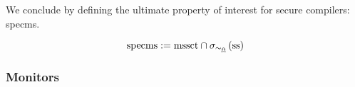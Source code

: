 \documentclass[a4paper,12pt]{article}
\begin{document}
We conclude by defining the ultimate property of interest for secure compilers: \gls*{specms}.
\begin{definition}{}
  \[
  \specmssafe := \msscctsafe\cap\sigma_{\sim_{\mathghost}}\left(\sssafe\right)
  \]
\end{definition}


\subsubsection{Monitors}\label{subsubsec-cs-properties-monitors}

\clearpage



\printglossary
\end{document}
